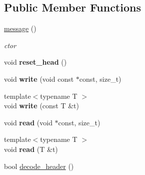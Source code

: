 \subsection*{\-Public \-Member \-Functions}
\begin{DoxyCompactItemize}
\item 
\hypertarget{classgal_1_1network_1_1message_aeec430b4ea74cce419d9a5ab771ebf25}{\hyperlink{classgal_1_1network_1_1message_aeec430b4ea74cce419d9a5ab771ebf25}{message} ()}\label{classgal_1_1network_1_1message_aeec430b4ea74cce419d9a5ab771ebf25}

\begin{DoxyCompactList}\small\item\em ctor \end{DoxyCompactList}\item 
\hypertarget{classgal_1_1network_1_1message_ab842233a27510bdbbdb0337049fd2eb5}{void {\bfseries reset\-\_\-head} ()}\label{classgal_1_1network_1_1message_ab842233a27510bdbbdb0337049fd2eb5}

\item 
\hypertarget{classgal_1_1network_1_1message_a23e1cbdcbe0cf7d5b6aba227879c45f7}{void {\bfseries write} (void const $\ast$const, size\-\_\-t)}\label{classgal_1_1network_1_1message_a23e1cbdcbe0cf7d5b6aba227879c45f7}

\item 
\hypertarget{classgal_1_1network_1_1message_ac88f51fa333851e03b05f03554307ed4}{{\footnotesize template$<$typename T $>$ }\\void {\bfseries write} (const \-T \&t)}\label{classgal_1_1network_1_1message_ac88f51fa333851e03b05f03554307ed4}

\item 
\hypertarget{classgal_1_1network_1_1message_a9fe9ec92c4b1a42a945730888fb3699b}{void {\bfseries read} (void $\ast$const, size\-\_\-t)}\label{classgal_1_1network_1_1message_a9fe9ec92c4b1a42a945730888fb3699b}

\item 
\hypertarget{classgal_1_1network_1_1message_a2fa1acaf178e4df7238e11f351eea80f}{{\footnotesize template$<$typename T $>$ }\\void {\bfseries read} (\-T \&t)}\label{classgal_1_1network_1_1message_a2fa1acaf178e4df7238e11f351eea80f}

\item 
\hypertarget{classgal_1_1network_1_1message_a082f0894a0f22d02f14f6eca893b6702}{bool \hyperlink{classgal_1_1network_1_1message_a082f0894a0f22d02f14f6eca893b6702}{decode\-\_\-header} ()}\label{classgal_1_1network_1_1message_a082f0894a0f22d02f14f6eca893b6702}


\end{DoxyCompactItemize}
